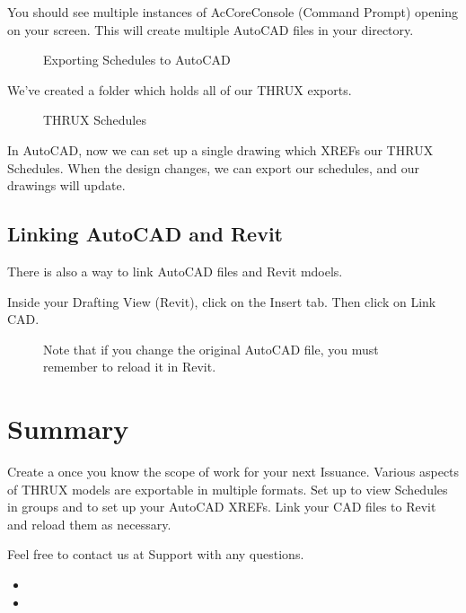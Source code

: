 \documentclass[letterpaper,10pt,english]{sphinxmanual}
\begin{document}
You should see multiple instances of AcCoreConsole (Command Prompt) opening on your screen.  This will create multiple AutoCAD files in your directory.

\begin{figure}[H]
\centering
\capstart

\noindent{}
\caption{Exporting Schedules to AutoCAD}\label{\detokenize{index:id7}}\end{figure}

We’ve created a folder which holds all of our THRUX exports.

\begin{figure}[H]
\centering
\capstart

\noindent{}
\caption{THRUX Schedules}\label{\detokenize{index:id8}}\end{figure}

In AutoCAD, now we can set up a single drawing which XREFs our THRUX Schedules.  When the design changes, we can export our schedules, and our drawings will update.

\newpage


\section{Linking AutoCAD and Revit}
\label{\detokenize{index:linking-autocad-and-revit}}
There is also a way to link AutoCAD files and Revit mdoels.

Inside your Drafting View (Revit), click on the Insert tab.  Then click on Link CAD.

\begin{figure}[H]
\centering
\capstart

\noindent{}
\caption{Note that if you change the original AutoCAD file, you must remember to reload it in Revit.}\label{\detokenize{index:id9}}\end{figure}


\chapter{Summary}
\label{\detokenize{index:summary}}
Create a {\hyperref[\detokenize{index:branching}]{}} once you know the scope of work for your next Issuance.  Various aspects of THRUX models are exportable in multiple formats.  Set up {\hyperref[\detokenize{index:schedule-views}]{}} to view Schedules in groups and to set up your AutoCAD XREFs.  Link your CAD files to Revit and reload them as necessary.

Feel free to contact us at Support with any questions.
\begin{itemize}
\item {} 

\item {} 

\end{itemize}



\renewcommand{\indexname}{Index}
\printindex
\end{document}
